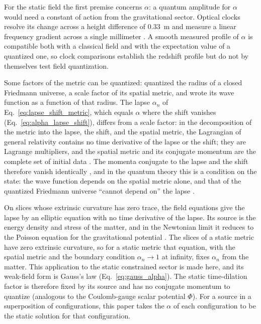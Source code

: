 \documentclass[aps,prd,onecolumn,tightenlines,nofootinbib,notitlepage,11pt,floatfix]{revtex4-2}
\theoremstyle{indentedtheorem}
\begin{document}
For the static field the first premise concerns $\alpha$: a quantum amplitude for $\alpha$ would need a constant of action from the gravitational sector. Optical clocks resolve its change across a height difference of $0.33$~m \citep{Chou2010Optical} and measure a linear frequency gradient across a single millimeter \citep{Bothwell2022Resolving}. A smooth measured profile of $\alpha$ is compatible both with a classical field and with the expectation value of a quantized one, so clock comparisons establish the redshift profile but do not by themselves test field quantization.

Some factors of the metric can be quantized: \citet{DeWitt1967Quantum} quantized the radius of a closed Friedmann universe, a scale factor of its spatial metric, and wrote its wave function as a function of that radius. The lapse $\alpha_n$ of Eq.~\eqref{eq:lapse_shift_metric}, which equals $\alpha$ where the shift vanishes (Eq.~\eqref{eq:alpha_lapse_shift}), differs from a scale factor: in the decomposition of the metric into the lapse, the shift, and the spatial metric, the Lagrangian of general relativity contains no time derivative of the lapse or the shift; they are Lagrange multipliers, and the spatial metric and its conjugate momentum are the complete set of initial data \citep{Arnowitt2008Dynamics,Gourgoulhon2007Formalism}. The momenta conjugate to the lapse and the shift therefore vanish identically \citep{DeWitt1967Quantum,Gourgoulhon2007Formalism}, and in the quantum theory this is a condition on the state: the wave function depends on the spatial metric alone, and that of the quantized Friedmann universe ``cannot depend on'' the lapse \citep{DeWitt1967Quantum}.

On slices whose extrinsic curvature has zero trace, the field equations give the lapse by an elliptic equation with no time derivative of the lapse. Its source is the energy density and stress of the matter, and in the Newtonian limit it reduces to the Poisson equation for the gravitational potential \citep{Gourgoulhon2007Formalism}. The slices of a static metric have zero extrinsic curvature, so for a static metric that equation, with the spatial metric and the boundary condition $\alpha_n\to1$ at infinity, fixes $\alpha_n$ from the matter. This application to the static constrained sector is made here, and its weak-field form is Gauss's law (Eq.~\eqref{eq:gauss_alpha}). The static time-dilation factor is therefore fixed by its source and has no conjugate momentum to quantize (analogous to the Coulomb-gauge scalar potential $\Phi$). For a source in a superposition of configurations, this paper takes the $\alpha$ of each configuration to be the static solution for that configuration.
\end{document}
